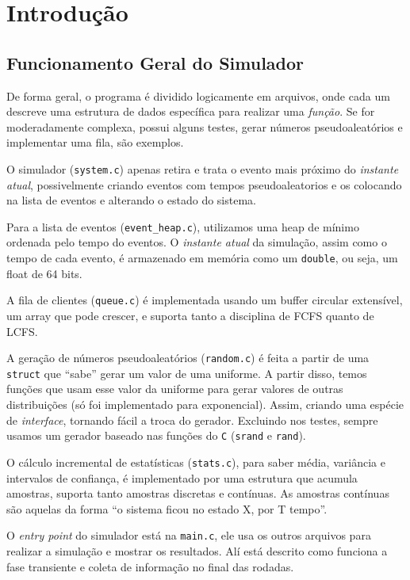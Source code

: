 \documentclass[a4paper]{article}
\newcommand{\arq}{\texttt}
\newcommand{\inlcode}{\texttt}
\newcommand{\lang}{\texttt}
\begin{document}
\section{Introdução}
\subsection{Funcionamento Geral do Simulador}
De forma geral,
o programa é dividido logicamente em arquivos,
onde cada um descreve uma estrutura de dados
específica para realizar uma \emph{função}.
Se for moderadamente complexa, possui alguns testes,
gerar números pseudoaleatórios e implementar uma fila,
são exemplos.

O simulador (\arq{system.c})
apenas retira e trata o evento mais próximo do \emph{instante atual},
possivelmente criando eventos com tempos pseudoaleatorios
e os colocando na lista de eventos e alterando o estado do sistema.

Para a lista de eventos (\arq{event\_heap.c}),
utilizamos uma heap de mínimo ordenada pelo tempo do eventos.
O \emph{instante atual} da simulação,
assim como o tempo de cada evento,
é armazenado em memória como um \inlcode{double}, ou seja,
um float de 64 bits.

A fila de clientes (\arq{queue.c})
é implementada usando um buffer circular extensível,
um array que pode crescer,
e suporta tanto a disciplina de FCFS quanto de LCFS.

A geração de números pseudoaleatórios (\arq{random.c})
é feita a partir de uma \inlcode{struct} que ``sabe''
gerar um valor de uma uniforme.
A partir disso, temos funções que usam esse valor da uniforme
para gerar valores de outras distribuições
(só foi implementado para exponencial).
Assim, criando uma espécie de \emph{interface},
tornando fácil a troca do gerador.
Excluindo nos testes, sempre usamos
um gerador baseado nas funções do \lang{C}
(\inlcode{srand} e \inlcode{rand}).

O cálculo incremental de estatísticas (\arq{stats.c}),
para saber média, variância e intervalos de confiança,
é implementado por uma estrutura que acumula amostras,
suporta tanto amostras discretas e contínuas.
As amostras contínuas são aquelas da forma
``o sistema ficou no estado X, por T tempo''.

O \emph{entry point} do simulador está na \arq{main.c},
ele usa os outros arquivos para realizar a simulação
e mostrar os resultados.
Alí está descrito como funciona a fase transiente e
coleta de informação no final das rodadas.
\end{document}

